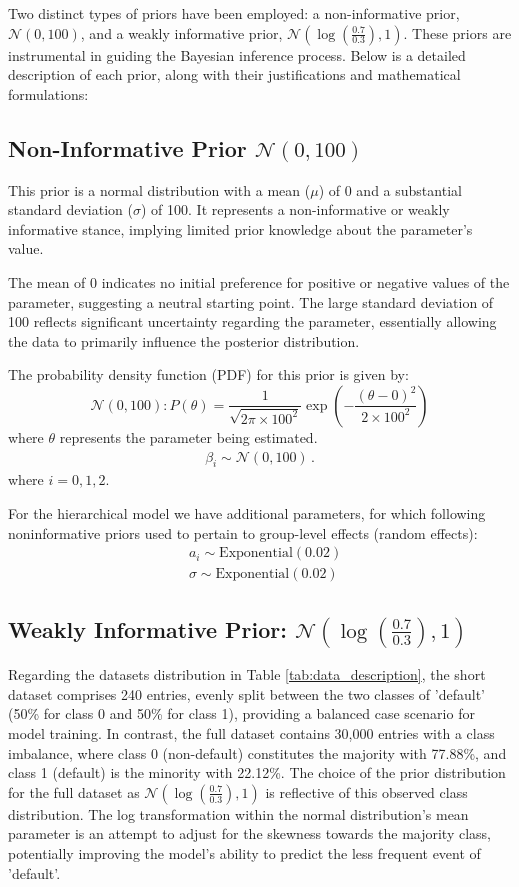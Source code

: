 \documentclass[a4paper]{artikel3}
\begin{document}
Two distinct types of priors have been employed: a non-informative prior, $\mathcal{N}(0,100)$, and a weakly informative prior, $\mathcal{N}(\log(\frac{0.7}{0.3}), 1)$. These priors are instrumental in guiding the Bayesian inference process. Below is a detailed description of each prior, along with their justifications and mathematical formulations:

\subsection{Non-Informative Prior $\mathcal{N}(0,100)$}

This prior is a normal distribution with a mean ($\mu$) of 0 and a substantial standard deviation ($\sigma$) of 100. It represents a non-informative or weakly informative stance, implying limited prior knowledge about the parameter's value.

The mean of 0 indicates no initial preference for positive or negative values of the parameter, suggesting a neutral starting point. The large standard deviation of 100 reflects significant uncertainty regarding the parameter, essentially allowing the data to primarily influence the posterior distribution.

The probability density function (PDF) for this prior is given by:
\[ \mathcal{N}(0,100): P(\theta) = \frac{1}{\sqrt{2\pi \times 100^2}} \exp\left(-\frac{(\theta - 0)^2}{2 \times 100^2}\right) \]
where \( \theta \) represents the parameter being estimated.
\begin{align*}
    \beta_i \sim \mathcal{N}(0,100)\,.
\end{align*}
where $i= 0,1,2$.

For the hierarchical model we have additional parameters, for which following noninformative priors used to pertain to group-level effects (random effects):
\begin{align*}
    & a_i \sim \text{Exponential}(0.02) \\\nonumber
    & \sigma \sim \text{Exponential}(0.02)
\end{align*}


\subsection{Weakly Informative Prior: $\mathcal{N}(\log(\frac{0.7}{0.3}), 1)$}

Regarding the datasets distribution in Table \ref{tab:data_description}, the short dataset comprises 240 entries, evenly split between the two classes of 'default' (50\% for class 0 and 50\% for class 1), providing a balanced case scenario for model training. In contrast, the full dataset contains 30,000 entries with a class imbalance, where class 0 (non-default) constitutes the majority with 77.88\%, and class 1 (default) is the minority with 22.12\%. The choice of the prior distribution for the full dataset as $\mathcal{N}(\log(\frac{0.7}{0.3}), 1)$ is reflective of this observed class distribution. The log transformation within the normal distribution's mean parameter is an attempt to adjust for the skewness towards the majority class, potentially improving the model's ability to predict the less frequent event of 'default'.
\end{document}
